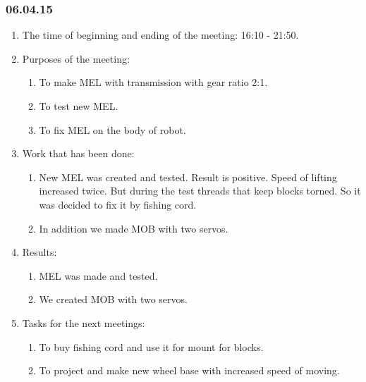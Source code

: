 \subsubsection{06.04.15}
\begin{enumerate}
	
	\item The time of beginning and ending of the meeting: 16:10 - 21:50.
	
	\item Purposes of the meeting: 
	\begin{enumerate}
		
		\item To make MEL with transmission with gear ratio 2:1.
		
		\item To test new MEL.
		
        \item To fix MEL on the body of robot.
		
	\end{enumerate}

	\item Work that has been done:
	\begin{enumerate}
		
		\item New MEL was created and tested. Result is positive. Speed of lifting increased twice. But during the test threads that keep blocks torned. So it was decided to fix it by fishing cord.
		
		\item In addition we made MOB with two servos.

	\end{enumerate}
	
	\item Results:
	\begin{enumerate}
		
		\item MEL was made and tested.
		
		\item We created MOB with two servos.

	\end{enumerate}
	
	\item Tasks for the next meetings:
	\begin{enumerate}
		
		\item To buy fishing cord and use it for mount for blocks.
		
		\item To project and make new wheel base with increased speed of moving.

	\end{enumerate}
\end{enumerate}
\fillpage

